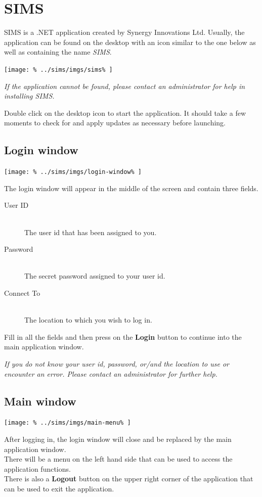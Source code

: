 \documentclass[../main/main]{subfiles}
\begin{document}
\newpage
\chapter{SIMS}

SIMS is a .NET application created by Synergy Innovations Ltd.
Usually, the application can be found on the desktop with an icon
similar to the one below as well as containing the name \emph{SIMS}.

\texttt{[image: \%
  ../sims/imgs/sims\%
]}

\emph{If the application cannot be found, please contact an
  administrator for help in installing SIMS.}

Double click on the desktop icon to start the application. It should
take a few moments to check for and apply updates as necessary
before launching.

\section{Login window}

\texttt{[image: \%
  ../sims/imgs/login-window\%
]}

The login window will appear in the middle of the screen and contain
three fields.
\begin{description}
\item[User ID] \hfill \\
  The user id that has been assigned to you.
\item[Password] \hfill \\
  The secret password assigned to your user id.
\item[Connect To] \hfill \\
  The location to which you wish to log in.
\end{description}

Fill in all the fields and then press on the \textbf{Login} button
to continue into the main application window.

\emph{If you do not know your user id, password, or/and the location
  to use or encounter an error. Please contact an administrator for
  further help.}

\section{Main window}

\texttt{[image: \%
  ../sims/imgs/main-menu\%
]}

After logging in, the login window will close and be replaced by
the main application window.\\
There will be a menu on the left hand side that can be used to access
the application functions.\\
There is also a \textbf{Logout} button on the upper right corner of
the application that can be used to exit the application.
\end{document}
